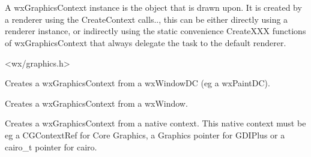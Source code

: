
\section{}\label{wxgraphicscontext}

A wxGraphicsContext instance is the object that is drawn upon. It is created by a renderer using the CreateContext calls.., this can be either directly using a renderer 
instance, or indirectly using the static convenience CreateXXX functions of wxGraphicsContext that always delegate the task to the default renderer.




<wx/graphics.h>


\label{wxgraphicscontextcreate}


Creates a wxGraphicsContext from a wxWindowDC (eg a wxPaintDC).


Creates a wxGraphicsContext from a wxWindow.



\label{wxgraphicscontextcreatefromnative}

Creates a wxGraphicsContext from a native context. This native context must be eg a CGContextRef for Core Graphics, a Graphics pointer for GDIPlus or a 
cairo\_t pointer for cairo.


